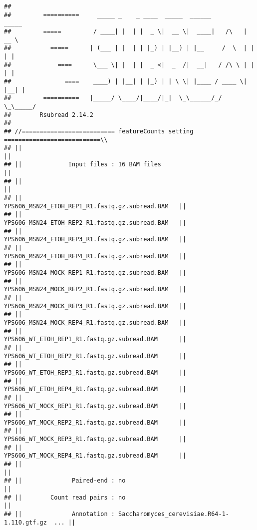\documentclass[
]{book}
\begin{document}
\begin{verbatim}
## 
##         ==========     _____ _    _ ____  _____  ______          _____  
##         =====         / ____| |  | |  _ \|  __ \|  ____|   /\   |  __ \ 
##           =====      | (___ | |  | | |_) | |__) | |__     /  \  | |  | |
##             ====      \___ \| |  | |  _ <|  _  /|  __|   / /\ \ | |  | |
##               ====    ____) | |__| | |_) | | \ \| |____ / ____ \| |__| |
##         ==========   |_____/ \____/|____/|_|  \_\______/_/    \_\_____/
##        Rsubread 2.14.2
## 
## //========================== featureCounts setting ===========================\\
## ||                                                                            ||
## ||             Input files : 16 BAM files                                     ||
## ||                                                                            ||
## ||                           YPS606_MSN24_ETOH_REP1_R1.fastq.gz.subread.BAM   ||
## ||                           YPS606_MSN24_ETOH_REP2_R1.fastq.gz.subread.BAM   ||
## ||                           YPS606_MSN24_ETOH_REP3_R1.fastq.gz.subread.BAM   ||
## ||                           YPS606_MSN24_ETOH_REP4_R1.fastq.gz.subread.BAM   ||
## ||                           YPS606_MSN24_MOCK_REP1_R1.fastq.gz.subread.BAM   ||
## ||                           YPS606_MSN24_MOCK_REP2_R1.fastq.gz.subread.BAM   ||
## ||                           YPS606_MSN24_MOCK_REP3_R1.fastq.gz.subread.BAM   ||
## ||                           YPS606_MSN24_MOCK_REP4_R1.fastq.gz.subread.BAM   ||
## ||                           YPS606_WT_ETOH_REP1_R1.fastq.gz.subread.BAM      ||
## ||                           YPS606_WT_ETOH_REP2_R1.fastq.gz.subread.BAM      ||
## ||                           YPS606_WT_ETOH_REP3_R1.fastq.gz.subread.BAM      ||
## ||                           YPS606_WT_ETOH_REP4_R1.fastq.gz.subread.BAM      ||
## ||                           YPS606_WT_MOCK_REP1_R1.fastq.gz.subread.BAM      ||
## ||                           YPS606_WT_MOCK_REP2_R1.fastq.gz.subread.BAM      ||
## ||                           YPS606_WT_MOCK_REP3_R1.fastq.gz.subread.BAM      ||
## ||                           YPS606_WT_MOCK_REP4_R1.fastq.gz.subread.BAM      ||
## ||                                                                            ||
## ||              Paired-end : no                                               ||
## ||        Count read pairs : no                                               ||
## ||              Annotation : Saccharomyces_cerevisiae.R64-1-1.110.gtf.gz  ... ||

\end{verbatim}
\end{document}
